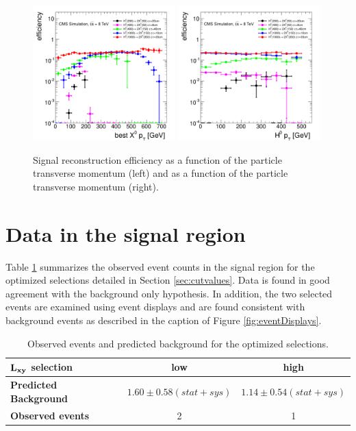 \begin{figure}[htbp]
\includegraphics[width=0.49\textwidth]{plots/signal/effXPt.pdf}
\includegraphics[width=0.49\textwidth]{plots/signal/effHPt.pdf}
\caption{Signal reconstruction efficiency as a function of the \X particle transverse 
momentum (left) and as a function of the \Higgs particle transverse momentum (right).
\label{fig:effPt}}
\end{figure}


\section{Data in the signal region}
\label{sec:fullunblinding}

Table \ref{tab:fullunblinding} summarizes the observed event counts in the signal region for the optimized 
selections detailed in Section \ref{sec:cutvalues}. Data is found in good agreement with the 
background only hypothesis. In addition, the two selected events are examined using event displays
and are found consistent with background events as described in the caption of 
Figure \ref{fig:eventDisplays}.  

\begin{table}[htbp]
\centering
\begin{tabular}{|l|c|c|}
\hline
$\bf L_{xy}$ \bf selection & \bf low & \bf high \\
\hline
\bf Predicted Background & $ 1.60\pm0.58(stat+sys)$ & $ 1.14\pm0.54(stat+sys)$ \\
\hline
\bf Observed events & 2 & 1 \\ 
\hline
\end{tabular}
\caption{Observed events and predicted background for the optimized selections.\label{tab:fullunblinding}}
\end{table}

